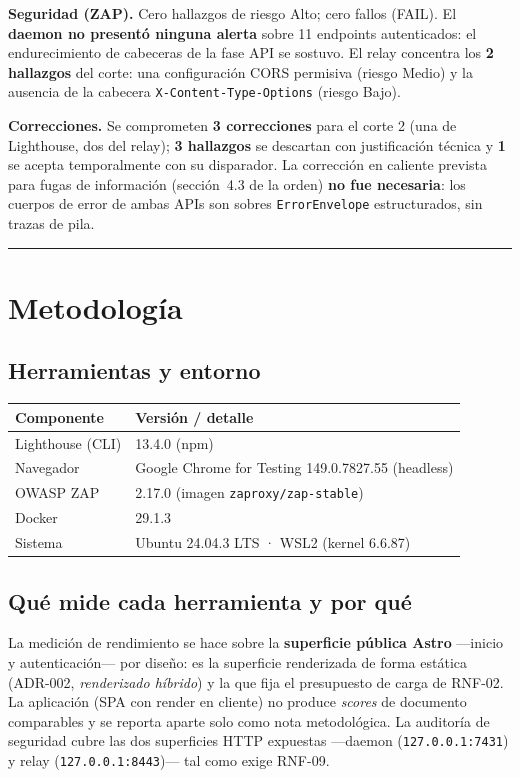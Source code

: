 \documentclass[11pt]{article}
\newcommand{\regla}{\noindent\textcolor{linea}{\rule{\linewidth}{0.4pt}}}
\newcommand{\veredicto}[1]{\textbf{\textcolor{salvia}{#1}}}
\begin{document}
\medskip
\noindent\textbf{Seguridad (ZAP).} Cero hallazgos de riesgo Alto; cero fallos
(\textsf{FAIL}). El \veredicto{daemon no presentó ninguna alerta} sobre 11
endpoints autenticados: el endurecimiento de cabeceras de la fase API se sostuvo.
El relay concentra los \veredicto{2 hallazgos} del corte: una configuración CORS
permisiva (riesgo Medio) y la ausencia de la cabecera \texttt{X-Content-Type-Options}
(riesgo Bajo).

\medskip
\noindent\textbf{Correcciones.} Se comprometen \veredicto{3 correcciones} para el
corte 2 (una de Lighthouse, dos del relay); \veredicto{3 hallazgos} se descartan
con justificación técnica y \veredicto{1} se acepta temporalmente con su
disparador. La corrección en caliente prevista para fugas de información
(sección~4.3 de la orden) \veredicto{no fue necesaria}: los cuerpos de error de
ambas APIs son sobres \texttt{ErrorEnvelope} estructurados, sin trazas de pila.

\regla

\section{Metodología}
\subsection{Herramientas y entorno}
\noindent
\begin{tabularx}{\linewidth}{@{}l X@{}}
\toprule
\textbf{Componente} & \textbf{Versión / detalle} \\
\midrule
Lighthouse (CLI)   & 13.4.0 (npm) \\
Navegador          & Google Chrome for Testing 149.0.7827.55 (headless) \\
OWASP ZAP          & 2.17.0 (imagen \texttt{zaproxy/zap-stable}) \\
Docker             & 29.1.3 \\
Sistema            & Ubuntu 24.04.3 LTS · WSL2 (kernel 6.6.87) \\
\bottomrule
\end{tabularx}

\subsection{Qué mide cada herramienta y por qué}
La medición de rendimiento se hace sobre la \textbf{superficie pública Astro}
—inicio y autenticación— por diseño: es la superficie renderizada de forma
estática (ADR-002, \emph{renderizado híbrido}) y la que fija el presupuesto de
carga de RNF-02. La aplicación (SPA con render en cliente) no produce
\emph{scores} de documento comparables y se reporta aparte solo como nota
metodológica. La auditoría de seguridad cubre las dos superficies HTTP expuestas
—daemon (\texttt{127.0.0.1:7431}) y relay (\texttt{127.0.0.1:8443})— tal como
exige RNF-09.
\end{document}
